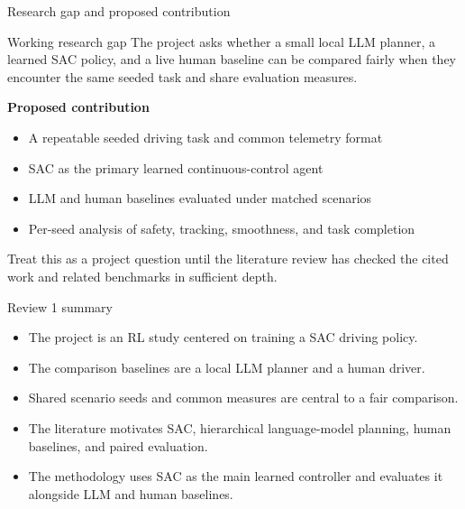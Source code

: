 \documentclass[aspectratio=169,10pt]{beamer}
\begin{document}
\begin{frame}{Research gap and proposed contribution}
\begin{block}{Working research gap}
The project asks whether a small local LLM planner, a learned SAC policy, and a live human baseline can be compared fairly when they encounter the same seeded task and share evaluation measures.
\end{block}
\textbf{Proposed contribution}
\begin{itemize}
  \item A repeatable seeded driving task and common telemetry format
  \item SAC as the primary learned continuous-control agent
  \item LLM and human baselines evaluated under matched scenarios
  \item Per-seed analysis of safety, tracking, smoothness, and task completion
\end{itemize}
\small Treat this as a project question until the literature review has checked the cited work and related benchmarks in sufficient depth.
\end{frame}

\begin{frame}{Review 1 summary}
\begin{itemize}
  \item The project is an RL study centered on training a SAC driving policy.
  \item The comparison baselines are a local LLM planner and a human driver.
  \item Shared scenario seeds and common measures are central to a fair comparison.
  \item The literature motivates SAC, hierarchical language-model planning, human baselines, and paired evaluation.
  \item The methodology uses SAC as the main learned controller and evaluates it alongside LLM and human baselines.
\end{itemize}
\end{frame}
\end{document}
